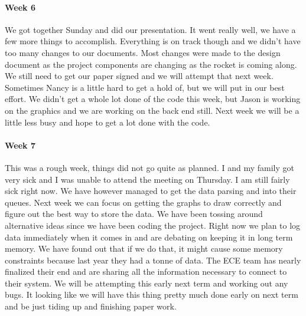 \documentclass[10pt,draftclsnofoot,onecolumn,retainorgcmds]{IEEEtran}
\begin{document}
\paragraph{Week 6}
We got together Sunday and did our presentation. It went really well, we have a few more things to accomplish. Everything is on track though and we didn't have too many changes to our documents. Most changes were made to the design document as the project components are changing as the rocket is coming along. We still need to get our paper signed and we will attempt that next week. Sometimes Nancy is a little hard to get a hold of, but we will put in our best effort. We didn't get a whole lot done of the code this week, but Jason is working on the graphics and we are working on the back end still. Next week we will be a little less busy and hope to get a lot done with the code.\\
\paragraph{Week 7}
This was a rough week, things did not go quite as planned. I and my family got very sick and I was unable to attend the meeting on Thursday. I am still fairly sick right now. We have however managed to get the data parsing and into their queues. Next week we can focus on getting the graphs to draw correctly and figure out the best way to store the data. We have been tossing around alternative ideas since we have been coding the project. Right now we plan to log data immediately when it comes in and are debating on keeping it in long term memory. We have found out that if we do that, it might cause some memory constraints because last year they had a tonne of data. The ECE team has nearly finalized their end and are sharing all the information necessary to connect to their system. We will be attempting this early next term and working out any bugs. It looking like we will have this thing pretty much done early on next term and be just tiding up and finishing paper work.\\
\end{document}
